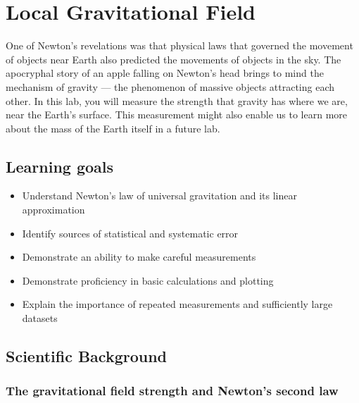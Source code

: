 \chapter{Local Gravitational Field}

One of Newton's revelations was that physical laws that governed the movement of objects near Earth also predicted the movements of objects in the sky.
The apocryphal story of an apple falling on Newton's head brings to mind the mechanism of gravity --- the phenomenon of massive objects attracting each other.
In this lab, you will measure the strength that gravity has where we are, near the Earth's surface. This measurement might also enable us to learn more about the mass of the Earth itself in a future lab.

\section{Learning goals}

\begin{itemize}
	\item Understand Newton's law of universal gravitation and its linear approximation
	
	\item Identify sources of statistical and systematic error
	
	\item Demonstrate an ability to make careful measurements
	
	\item Demonstrate proficiency in basic calculations and plotting
	
	\item Explain the importance of repeated measurements and sufficiently large datasets
\end{itemize}

\section{Scientific Background}

\subsection{The gravitational field strength and Newton's second law}

